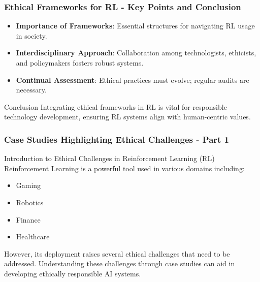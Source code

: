 \documentclass[aspectratio=169]{beamer}
\begin{document}
\begin{frame}[fragile]
    \frametitle{Ethical Frameworks for RL - Key Points and Conclusion}
    \begin{itemize}
        \item \textbf{Importance of Frameworks}: Essential structures for navigating RL usage in society.
        \item \textbf{Interdisciplinary Approach}: Collaboration among technologists, ethicists, and policymakers fosters robust systems.
        \item \textbf{Continual Assessment}: Ethical practices must evolve; regular audits are necessary.
    \end{itemize}
    \begin{block}{Conclusion}
        Integrating ethical frameworks in RL is vital for responsible technology development, ensuring RL systems align with human-centric values.
    \end{block}
\end{frame}

\begin{frame}[fragile]
    \frametitle{Case Studies Highlighting Ethical Challenges - Part 1}
    \begin{block}{Introduction to Ethical Challenges in Reinforcement Learning (RL)}
        Reinforcement Learning is a powerful tool used in various domains including:
        \begin{itemize}
            \item Gaming
            \item Robotics
            \item Finance
            \item Healthcare
        \end{itemize}
        However, its deployment raises several ethical challenges that need to be addressed. 
        Understanding these challenges through case studies can aid in developing ethically responsible AI systems.
    \end{block}
\end{frame}
\end{document}
